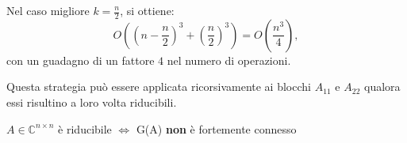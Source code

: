 \documentclass[12pt,a4paper,]{report}
\begin{document}
Nel caso migliore \(k = \frac{n}{2}\), si ottiene:
\[
O\left(\left(n - \frac{n}{2}\right)^3 + \left(\frac{n}{2}\right)^3\right)
= O\left(\frac{n^3}{4}\right),
\]
con un guadagno di un fattore \(4\) nel numero di operazioni.
\begin{nota}
    Questa strategia può essere applicata ricorsivamente ai blocchi \(A_{11}\) e \(A_{22}\) qualora essi risultino a loro volta riducibili.
\end{nota}

\begin{lezione}
    [Lezione 8 22/03]
\end{lezione}

\begin{teorema}
    $A\in \mathbb{C}^{n\times n}$ è riducibile $\Longleftrightarrow$ G(A) \textbf{non} è fortemente connesso
\end{teorema}
\end{document}

